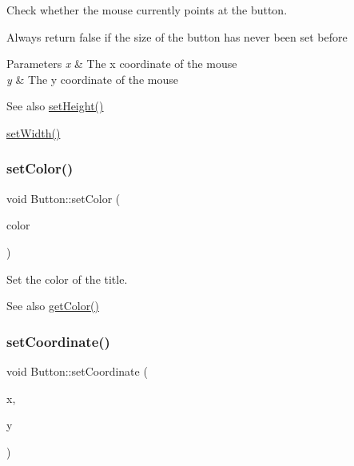 Check whether the mouse currently points at the button. 

Always return false if the size of the button has never been set before 
\begin{DoxyParams}{Parameters}
{\em x} & The x coordinate of the mouse \\
\hline
{\em y} & The y coordinate of the mouse \\
\hline
\end{DoxyParams}
\begin{DoxySeeAlso}{See also}
\mbox{\hyperlink{class_button_a6b048681f073eae03631251ddee96b17}{set\+Height()}} 

\mbox{\hyperlink{class_button_a77d90f51ba19a275e9d662cbb081049f}{set\+Width()}} 
\end{DoxySeeAlso}
\mbox{\label{class_button_a87418f0a2d9ecbff822627e4e728728e}} 
\subsubsection{\texorpdfstring{set\+Color()}{setColor()}}
{\footnotesize\ttfamily void Button\+::set\+Color (\begin{DoxyParamCaption}\item[{const \mbox{\hyperlink{class_r_g_b_color}{R\+G\+B\+Color}} \&}]{color }\end{DoxyParamCaption})\hspace{0.3cm}{\ttfamily [virtual]}}



Set the color of the title. 

\begin{DoxySeeAlso}{See also}
\mbox{\hyperlink{class_button_a3388931e8e8cef41336f973578304c8a}{get\+Color()}} 
\end{DoxySeeAlso}
\mbox{\label{class_button_a808e7d56490172fdeab84afb01fc4bde}} 
\subsubsection{\texorpdfstring{set\+Coordinate()}{setCoordinate()}}
{\footnotesize\ttfamily void Button\+::set\+Coordinate (\begin{DoxyParamCaption}\item[{const int \&}]{x,  }\item[{const int \&}]{y }\end{DoxyParamCaption})\hspace{0.3cm}{\ttfamily [virtual]}}



